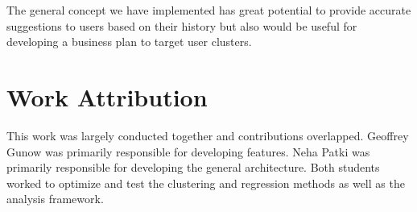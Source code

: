\documentclass[11pt]{article}
\begin{document}
The general concept we have implemented has great potential to provide accurate suggestions to users based on their history but also would be useful for developing a business plan to target user clusters. 
 
 \section{Work Attribution}
This work was largely conducted together and contributions overlapped. Geoffrey Gunow was primarily responsible for developing features. Neha Patki was primarily responsible for developing the general architecture. Both students worked to optimize and test the clustering and regression methods as well as the analysis framework.
 
\clearpage

\end{document}
